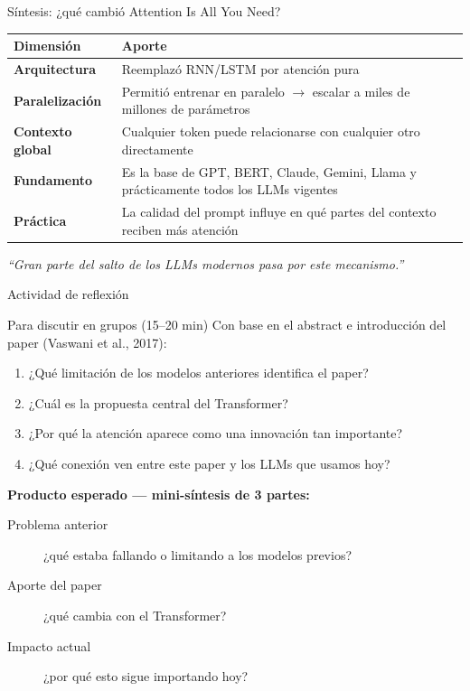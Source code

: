 \documentclass[aspectratio=169, 10pt]{beamer}
\begin{document}
\begin{frame}{Síntesis: ¿qué cambió Attention Is All You Need?}

  \begin{center}
  \begin{tabular}{>{\bfseries}p{3.5cm} p{8cm}}
    \toprule
    Dimensión & Aporte \\
    \midrule
    Arquitectura & Reemplazó RNN/LSTM por atención pura \\
    Paralelización & Permitió entrenar en paralelo $\rightarrow$ escalar a miles de millones de parámetros \\
    Contexto global & Cualquier token puede relacionarse con cualquier otro directamente \\
    Fundamento & Es la base de GPT, BERT, Claude, Gemini, Llama y prácticamente todos los LLMs vigentes \\
    Práctica & La calidad del prompt influye en qué partes del contexto reciben más atención \\
    \bottomrule
  \end{tabular}
  \end{center}

  \vspace{0.5em}
  \begin{center}
    \large \textit{``Gran parte del salto de los LLMs modernos pasa por este mecanismo.''}
  \end{center}

\end{frame}


\begin{frame}{Actividad de reflexión}

  \begin{block}{Para discutir en grupos (15--20 min)}
    Con base en el abstract e introducción del paper (Vaswani et al., 2017):
    \begin{enumerate}
      \item ¿Qué limitación de los modelos anteriores identifica el paper?
      \item ¿Cuál es la propuesta central del Transformer?
      \item ¿Por qué la atención aparece como una innovación tan importante?
      \item ¿Qué conexión ven entre este paper y los LLMs que usamos hoy?
    \end{enumerate}
  \end{block}

  \vspace{0.4em}
  \textbf{Producto esperado --- mini-síntesis de 3 partes:}
  \begin{description}
    \item[Problema anterior] ¿qué estaba fallando o limitando a los modelos previos?
    \item[Aporte del paper] ¿qué cambia con el Transformer?
    \item[Impacto actual] ¿por qué esto sigue importando hoy?
  \end{description}

\end{frame}
\end{document}
